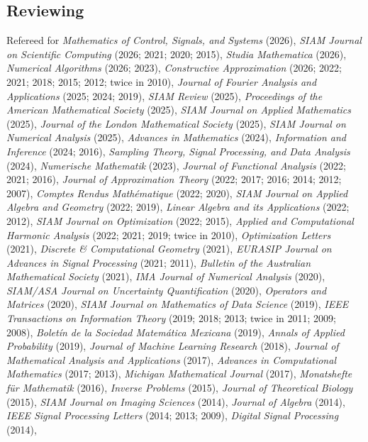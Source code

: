 \documentclass[11pt]{article}
\begin{document}
\subsection{Reviewing}
\bitemize
\item Refereed for 
{\sl Mathematics of Control, Signals, and Systems} (2026),
{\sl SIAM Journal on Scientific Computing} (2026; 2021; 2020; 2015),
{\sl Studia Mathematica} (2026),
{\sl Numerical Algorithms} (2026; 2023),
{\sl Constructive Approximation} (2026; 2022; 2021; 2018; 2015; 2012; twice in 2010),
{\sl Journal of Fourier Analysis and Applications} (2025; 2024; 2019),
{\sl SIAM Review} (2025),
{\sl Proceedings of the American Mathematical Society} (2025),
{\sl SIAM Journal on Applied Mathematics} (2025),
{\sl Journal of the London Mathematical Society} (2025),
{\sl SIAM Journal on Numerical Analysis} (2025),
{\sl Advances in Mathematics} (2024),
{\sl Information and Inference} (2024; 2016),
{\sl Sampling Theory, Signal Processing, and Data Analysis} (2024),
{\sl Numerische Mathematik} (2023),
{\sl Journal of Functional Analysis} (2022; 2021; 2016),
{\sl Journal of Approximation Theory} (2022; 2017; 2016; 2014; 2012; 2007),
{\sl Comptes Rendus Math\'ematique} (2022; 2020),
{\sl SIAM Journal on Applied Algebra and Geometry} (2022; 2019),
{\sl Linear Algebra and its Applications} (2022; 2012),
{\sl SIAM Journal on Optimization} (2022; 2015),
{\sl Applied and Computational Harmonic Analysis} (2022; 2021; 2019; twice in 2010),
{\sl Optimization Letters} (2021),
{\sl Discrete \& Computational Geometry} (2021),
{\sl EURASIP Journal on Advances in Signal Processing} (2021; 2011),
{\sl Bulletin of the Australian Mathematical Society} (2021),
{\sl IMA Journal of Numerical Analysis} (2020),
{\sl SIAM/ASA Journal on Uncertainty Quantification} (2020),
{\sl Operators and Matrices} (2020),
{\sl SIAM Journal on Mathematics of Data Science} (2019),
{\sl IEEE Transactions on Information Theory} (2019; 2018; 2013; twice in 2011; 2009; 2008),
{\sl Bolet\'in de la Sociedad Matem\'atica Mexicana} (2019),
{\sl Annals of Applied Probability} (2019),
{\sl Journal of Machine Learning Research} (2018),
{\sl Journal of Mathematical Analysis and Applications} (2017),
{\sl Advances in Computational Mathematics} (2017; 2013),
{\sl Michigan Mathematical Journal} (2017),
{\sl Monatshefte f\"ur Mathematik} (2016),
{\sl Inverse Problems} (2015),
{\sl Journal of Theoretical Biology} (2015),
{\sl SIAM Journal on Imaging Sciences} (2014),
{\sl Journal of Algebra} (2014),
{\sl IEEE Signal Processing Letters} (2014; 2013; 2009),
{\sl Digital Signal Processing} (2014),
\end{document}
